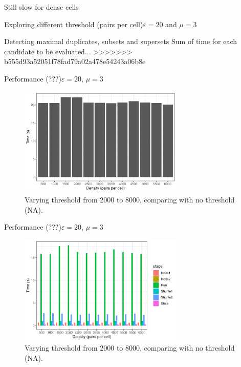 \documentclass{beamer}
\begin{document}
\begin{frame}{Still slow for dense cells}
\begin{frame}{Exploring different threshold (pairs per cell)}{$\varepsilon=20$ and $\mu=3$}
\begin{frame}{Detecting maximal duplicates, subsets and supersets}
        {Sum of time for each candidate to be evaluated...}
>>>>>>> b555d93a52051f78fad79a02a478e54243a06b8e
        \centering
\end{frame}

\begin{frame}{Performance (???)}{$\varepsilon=20$, $\mu=3$}
        \centering
        \begin{figure}
                \includegraphics[width=0.7\textwidth]{figures/Density/density}
                \caption{Varying threshold from 2000 to 8000, comparing with no threshold (NA).}
        \end{figure}
\end{frame}

\begin{frame}{Performance (???)}{$\varepsilon=20$, $\mu=3$}
        \centering
        \begin{figure}
                \includegraphics[width=0.7\textwidth]{figures/Density/densityByStage}
                \caption{Varying threshold from 2000 to 8000, comparing with no threshold (NA).}
        \end{figure}
\end{frame}


\end{frame}
\end{frame}
\end{document}
